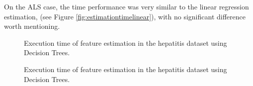 On the ALS case, the time performance was very similar to the linear regression estimation, (see Figure \ref{fig:estimationtimelinear}), with no significant difference worth mentioning.

\begin{figure}[h]
	\begin{subfigmatrix}{2}
	\end{subfigmatrix}
	\caption{Execution time of feature estimation in the hepatitis dataset using Decision Trees.}
	\label{fig:estimationtimetreeals}
\end{figure}

\begin{figure}[h]
	\begin{subfigmatrix}{2}
	\end{subfigmatrix}
	\caption{Execution time of feature estimation in the hepatitis dataset using Decision Trees.}
	\label{fig:estimationtimetreeh}
\end{figure}

